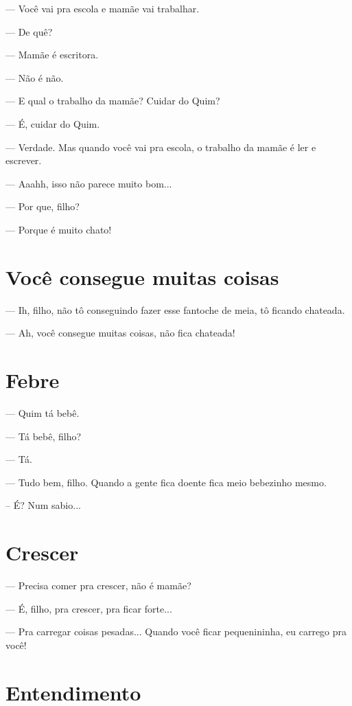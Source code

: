 {\parindent0pt\parskip1pt\raggedright
--- Você vai pra escola e mamãe vai trabalhar.

--- De quê?

--- Mamãe é escritora.

--- Não é não.

--- E qual o trabalho da mamãe? Cuidar do Quim?

--- É, cuidar do Quim.

--- Verdade. Mas quando você vai pra escola, o trabalho da mamãe é ler e
escrever.

--- Aaahh, isso não parece muito bom...

--- Por que, filho?

--- Porque é muito chato!

\chapter{Você consegue muitas
coisas}\label{vocuxea-consegue-muitas-coisas}

--- Ih, filho, não tô conseguindo fazer esse fantoche de meia, tô
ficando chateada.

--- Ah, você consegue muitas coisas, não fica chateada!

\chapter{Febre}\label{febre}

--- Quim tá bebê.

--- Tá bebê, filho?

--- Tá.

--- Tudo bem, filho. Quando a gente fica doente fica meio bebezinho
mesmo.

-- É? Num sabio...

\chapter{Crescer}\label{crescer}

--- Precisa comer pra crescer, não é mamãe?

--- É, filho, pra crescer, pra ficar forte...

--- Pra carregar coisas pesadas... Quando você ficar pequenininha, eu
carrego pra você!

\chapter{Entendimento}\label{entendimento}

}
